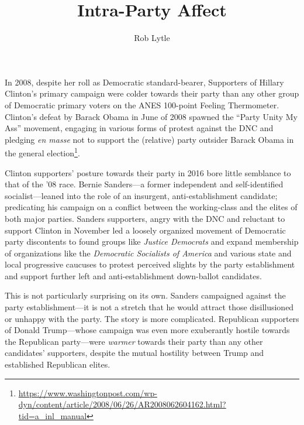 \documentclass[
  12,
]{paper}
\title{Intra-Party Affect}
\author{Rob Lytle}
\date{}
\begin{document}
\maketitle

\doublespacing

In 2008, despite her roll as Democratic standard-bearer, Supporters of
Hillary Clinton's primary campaign were colder towards their party than
any other group of Democratic primary voters on the ANES 100-point
Feeling Thermometer. Clinton's defeat by Barack Obama in June of 2008
spawned the ``Party Unity My Ass'' movement, engaging in various forms
of protest against the DNC and pledging \emph{en masse} not to support
the (relative) party outsider Barack Obama in the general
election\footnote{\url{https://www.washingtonpost.com/wp-dyn/content/article/2008/06/26/AR2008062604162.html?tid=a_inl_manual}}.

Clinton supporters' posture towards their party in 2016 bore little
semblance to that of the '08 race. Bernie Sanders---a former independent
and self-identified socialist---leaned into the role of an insurgent,
anti-establishment candidate; predicating his campaign on a conflict
between the working-class and the elites of both major parties. Sanders
supporters, angry with the DNC and reluctant to support Clinton in
November led a loosely organized movement of Democratic party
discontents to found groups like \emph{Justice Democrats} and expand
membership of organizations like the \emph{Democratic Socialists of
America} and various state and local progressive caucuses to protest
perceived slights by the party establishment and support further left
and anti-establishment down-ballot candidates.

This is not particularly surprising on its own. Sanders campaigned
against the party establishment---it is not a stretch that he would
attract those disillusioned or unhappy with the party. The story is more
complicated. Republican supporters of Donald Trump---whose campaign was
even more exuberantly hostile towards the Republican party---were
\emph{warmer} towards their party than any other candidates' supporters,
despite the mutual hostility between Trump and established Republican
elites.
\end{document}
